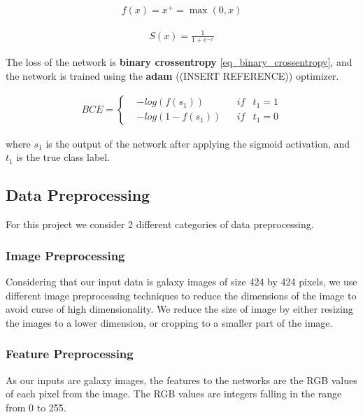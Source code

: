 \documentclass{article}
\begin{document}
\begin{equation}
\begin{aligned}  f(x)=x^{+}=\max (0, x) \end{aligned}
\label{eq_relu}
\end{equation}


\begin{equation}
\begin{aligned}  S(x)=\frac{1}{1+e^{-x}} \end{aligned}
\label{eq_sigmoid}
\end{equation}

The loss of the network is \textbf{binary crossentropy} \eqref{eq_binary_crossentropy}, and the network is trained using the \textbf{adam} ((INSERT REFERENCE)) optimizer.

\begin{equation}
\begin{aligned}  BCE = \left\{\begin{matrix} & - log(f(s_{1})) & & if & t_{1} = 1 \\ & - log(1 - f(s_{1})) & & if & t_{1} = 0 \end{matrix}\right. \end{aligned}
\label{eq_binary_crossentropy}
\end{equation}

where $s_1$ is the output of the network after applying the sigmoid activation, and $t_1$ is the true class label.

\subsection{Data Preprocessing}

For this project we consider 2 different categories of data preprocessing.

\subsubsection{Image Preprocessing}
Considering that our input data is galaxy images of size 424 by 424 pixels, we use different image preprocessing techniques to reduce the dimensions of the image to avoid curse of high dimensionality. We reduce the size of image by either resizing the images to a lower dimension, or cropping to a smaller part of the image.

\subsubsection{Feature Preprocessing}
As our inputs are galaxy images, the features to the networks are the RGB values of each pixel from the image. The RGB values are integers falling in the range from 0 to 255. 
\end{document}

